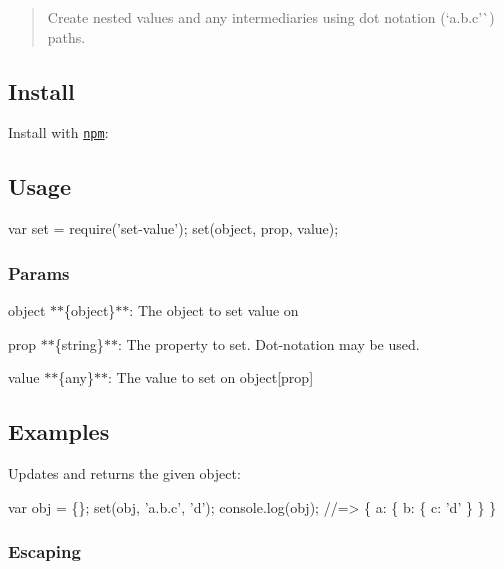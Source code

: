 \begin{quote}
Create nested values and any intermediaries using dot notation (`\textquotesingle{}a.\+b.\+c'\`{}) paths. \end{quote}


\subsection*{Install}

Install with \href{https://www.npmjs.com/}{\tt npm}\+:




\subsection*{Usage}


\begin{DoxyCode}
var set = require('set-value');
set(object, prop, value);
\end{DoxyCode}


\subsubsection*{Params}


\begin{DoxyItemize}
\item {\ttfamily object} $\ast$$\ast$\{object\}$\ast$$\ast$\+: The object to set {\ttfamily value} on
\item {\ttfamily prop} $\ast$$\ast$\{string\}$\ast$$\ast$\+: The property to set. Dot-\/notation may be used.
\item {\ttfamily value} $\ast$$\ast$\{any\}$\ast$$\ast$\+: The value to set on {\ttfamily object\mbox{[}prop\mbox{]}}
\end{DoxyItemize}

\subsection*{Examples}

Updates and returns the given object\+:


\begin{DoxyCode}
var obj = \{\};
set(obj, 'a.b.c', 'd');
console.log(obj);
//=> \{ a: \{ b: \{ c: 'd' \} \} \}
\end{DoxyCode}


\subsubsection*{Escaping}

